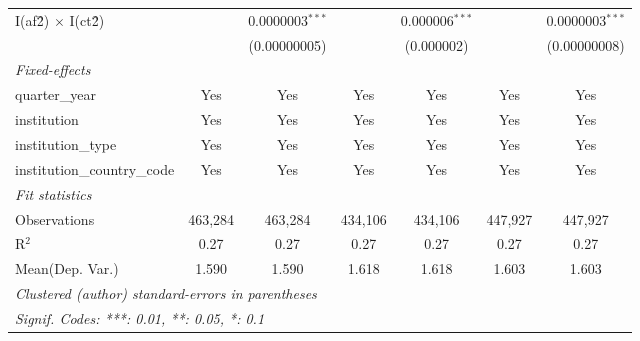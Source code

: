 \begin{tabular}{lcccccc}
   I(af\^2) $\times$ I(ct\^2)         &                & 0.0000003$^{***}$ &               & 0.000006$^{***}$ &               & 0.0000003$^{***}$\\   
                                      &                & (0.00000005)      &               & (0.000002)       &               & (0.00000008)\\   
   \midrule
   \emph{Fixed-effects}\\
   quarter\_year                      & Yes            & Yes               & Yes           & Yes              & Yes           & Yes\\  
   institution                        & Yes            & Yes               & Yes           & Yes              & Yes           & Yes\\  
   institution\_type                  & Yes            & Yes               & Yes           & Yes              & Yes           & Yes\\  
   institution\_country\_code         & Yes            & Yes               & Yes           & Yes              & Yes           & Yes\\  
   \midrule
   \emph{Fit statistics}\\
   Observations                       & 463,284        & 463,284           & 434,106       & 434,106          & 447,927       & 447,927\\  
   R$^2$                              & 0.27           & 0.27              & 0.27          & 0.27             & 0.27          & 0.27\\  
Mean(Dep. Var.) & 1.590 & 1.590 & 1.618 & 1.618 & 1.603 & 1.603 \\
   \midrule \midrule
   \multicolumn{7}{l}{\emph{Clustered (author) standard-errors in parentheses}}\\
   \multicolumn{7}{l}{\emph{Signif. Codes: ***: 0.01, **: 0.05, *: 0.1}}\\
\end{tabular}
\par\endgroup
